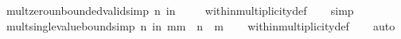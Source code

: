 \begin{isabellebody}
\isanewline
{}\isamarkupfalse%
\ mult{\isacharunderscore}zero{\isacharunderscore}unbounded{\isacharunderscore}valid{\isacharbrackleft}simp{\isacharbrackright}{\isacharcolon}\ {\isachardoublequoteopen}n\ in\ \isactrlemph {\isachardoublequoteclose}\isanewline
%
\isadelimproof
\ \ %
\endisadelimproof
%
\isatagproof
{}\isamarkupfalse%
\ within{\isacharunderscore}multiplicity{\isacharunderscore}def\isanewline
\ \ \isamarkupfalse%
\ simp%
\endisatagproof
{\isafoldproof}%
%
\isadelimproof
\isanewline
%
\endisadelimproof
\isanewline
{}\isamarkupfalse%
\ mult{\isacharunderscore}single{\isacharunderscore}value{\isacharunderscore}bound{\isacharbrackleft}simp{\isacharbrackright}{\isacharcolon}\ {\isachardoublequoteopen}n\ in\ \isactrlbold m{\isachardot}{\isachardot}\isactrlbold m\ {\isasymLongrightarrow}\ n\ {\isacharequal}\ m{\isachardoublequoteclose}\isanewline
%
\isadelimproof
\ \ %
\endisadelimproof
%
\isatagproof
{}\isamarkupfalse%
\ within{\isacharunderscore}multiplicity{\isacharunderscore}def\isanewline
\ \ \isamarkupfalse%
\ auto%
\endisatagproof
{\isafoldproof}%
%
\isadelimproof
%
\endisadelimproof
%
\isadelimdocument
%
\endisadelimdocument
%
\isatagdocument
%
\isadelimproof
\isanewline
%
\endisadelimproof
%
\isadelimtheory
\isanewline
%
\endisadelimtheory
%
\isatagtheory
{}\isamarkupfalse%
%
\endisatagtheory
{\isafoldtheory}%
%
\isadelimtheory
%
\endisadelimtheory
%
\end{isabellebody}%
\endinput